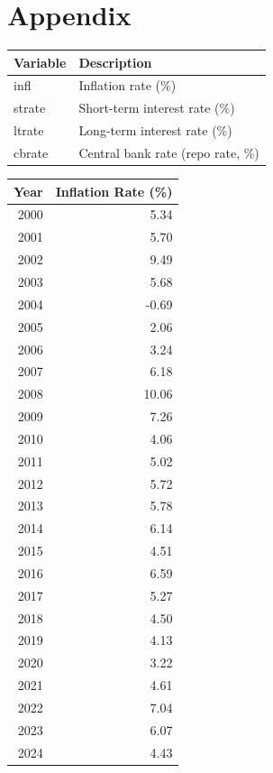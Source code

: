 \documentclass[11pt,preprint]{elsarticle}
\let\origtable\table
\let\endorigtable\endtable
\renewenvironment{table}[1][2] {
    \expandafter\origtable\expandafter[H]
} {
    \endorigtable
}
\numberwithin{equation}{section}
\numberwithin{figure}{section}
\numberwithin{table}{section}
\begin{document}
\newpage

\section*{Appendix}\label{appendix}

\begin{table}[H]
\centering
\begin{tabular}{ll}
  \hline
Variable & Description \\ 
  \hline
infl & Inflation rate (\%) \\ 
  strate & Short-term interest rate (\%) \\ 
  ltrate & Long-term interest rate (\%) \\ 
  cbrate & Central bank rate (repo rate, \%) \\ 
   \hline
\end{tabular}
\caption{Variable Descriptions\label{tab21}} 
\end{table}

\begin{table}[H]
\centering
\begin{tabular}{rr}
  \hline
Year & Inflation Rate (\%) \\ 
  \hline
2000 & 5.34 \\ 
  2001 & 5.70 \\ 
  2002 & 9.49 \\ 
  2003 & 5.68 \\ 
  2004 & -0.69 \\ 
  2005 & 2.06 \\ 
  2006 & 3.24 \\ 
  2007 & 6.18 \\ 
  2008 & 10.06 \\ 
  2009 & 7.26 \\ 
  2010 & 4.06 \\ 
  2011 & 5.02 \\ 
  2012 & 5.72 \\ 
  2013 & 5.78 \\ 
  2014 & 6.14 \\ 
  2015 & 4.51 \\ 
  2016 & 6.59 \\ 
  2017 & 5.27 \\ 
  2018 & 4.50 \\ 
  2019 & 4.13 \\ 
  2020 & 3.22 \\ 
  2021 & 4.61 \\ 
  2022 & 7.04 \\ 
  2023 & 6.07 \\ 
  2024 & 4.43 \\ 
   \hline
\end{tabular}
\caption{Annual Inflation Rate in South Africa (2000–2024) \label{tab8}} 
\end{table}
\end{document}
